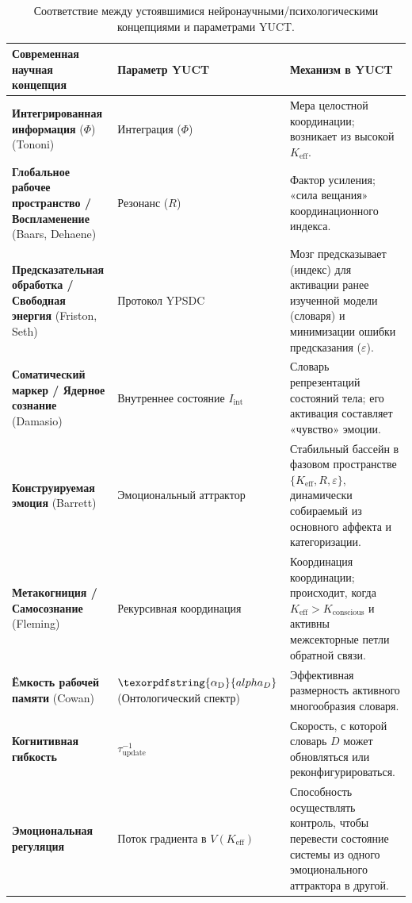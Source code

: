 \documentclass[12pt,a4paper]{article}
\DeclareRobustCommand{\alD}{\texorpdfstring{\ensuremath{\alpha_{\mathrm{D}}}}{alpha_D}}
\begin{document}
	\begin{table}[H]
		\centering
		\caption{Соответствие между устоявшимися нейронаучными/психологическими концепциями и параметрами YUCT.}
		\label{tab:mapping}
		\begin{tabular}{p{4.5cm} p{4cm} p{5cm}}
			\toprule
			\textbf{Современная научная концепция} & \textbf{Параметр YUCT} & \textbf{Механизм в YUCT} \\
			\midrule
			\textbf{Интегрированная информация} (\(\Phi\)) (Tononi) & Интеграция (\(\Phi\)) & Мера целостной координации; возникает из высокой \(K_{\mathrm{eff}}\). \\
			\textbf{Глобальное рабочее пространство / Воспламенение} (Baars, Dehaene) & Резонанс (\(R\)) & Фактор усиления; «сила вещания» координационного индекса. \\
			\textbf{Предсказательная обработка / Свободная энергия} (Friston, Seth) & Протокол YPSDC & Мозг предсказывает (индекс) для активации ранее изученной модели (словаря) и минимизации ошибки предсказания (\(\varepsilon\)). \\
			\textbf{Соматический маркер / Ядерное сознание} (Damasio) & Внутреннее состояние \(I_{\mathrm{int}}\) & Словарь репрезентаций состояний тела; его активация составляет «чувство» эмоции. \\
			\textbf{Конструируемая эмоция} (Barrett) & Эмоциональный аттрактор & Стабильный бассейн в фазовом пространстве \(\{K_{\mathrm{eff}}, R, \varepsilon\}\), динамически собираемый из основного аффекта и категоризации. \\
			\textbf{Метакогниция / Самосознание} (Fleming) & Рекурсивная координация & Координация координации; происходит, когда \(K_{\mathrm{eff}} > K_{\mathrm{conscious}}\) и активны межсекторные петли обратной связи. \\
			\textbf{Ёмкость рабочей памяти} (Cowan) & \(\alD\) (Онтологический спектр) & Эффективная размерность активного многообразия словаря. \\
			\textbf{Когнитивная гибкость} & \(\tau_{\mathrm{update}}^{-1}\) & Скорость, с которой словарь \(D\) может обновляться или реконфигурироваться. \\
			\textbf{Эмоциональная регуляция} & Поток градиента в \(V(K_{\mathrm{eff}})\) & Способность осуществлять контроль, чтобы перевести состояние системы из одного эмоционального аттрактора в другой. \\
			\bottomrule
		\end{tabular}
	\end{table}
	
\end{document}
